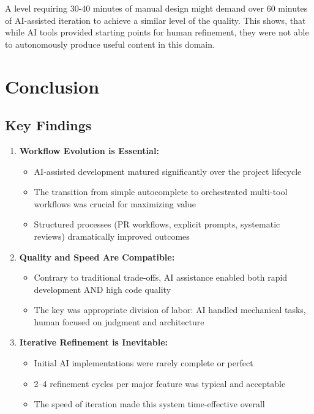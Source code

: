 \documentclass[12pt,a4paper]{article}
\begin{document}
A level requiring 30-40 minutes of manual design might demand over 60 minutes of AI-assisted iteration to achieve a similar level of the quality. This shows, that while AI tools provided starting points for human refinement, they were not able to autonomously produce useful  content in this domain.

\newpage

\section{Conclusion}

\subsection{Key Findings}

\begin{enumerate}
    \item \textbf{Workflow Evolution is Essential:}
    \begin{itemize}
        \item AI-assisted development matured significantly over the project lifecycle
        \item The transition from simple autocomplete to orchestrated multi-tool workflows was crucial for maximizing value
        \item Structured processes (PR workflows, explicit prompts, systematic reviews) dramatically improved outcomes
    \end{itemize}
    
    \item \textbf{Quality and Speed Are Compatible:}
    \begin{itemize}
        \item Contrary to traditional trade-offs, AI assistance enabled both rapid development AND high code quality
        \item The key was appropriate division of labor: AI handled mechanical tasks, human focused on judgment and architecture
    \end{itemize}
    
    \item \textbf{Iterative Refinement is Inevitable:}
    \begin{itemize}
        \item Initial AI implementations were rarely complete or perfect
        \item 2--4 refinement cycles per major feature was typical and acceptable
        \item The speed of iteration made this system time-effective overall
    \end{itemize}
    

\end{enumerate}
\end{document}
